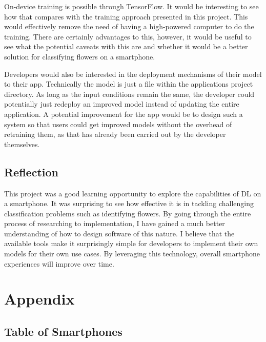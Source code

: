 \documentclass[12pt,a4paper]{report}
\begin{document}
\par

On-device training is possible through TensorFlow. It would be interesting to see how that compares with the training 
approach presented in this project. This would effectively remove the need of having a high-powered computer to do the 
training. There are certainly advantages to this, however, it would be useful to see what the potential caveats with 
this are and whether it would be a better solution for classifying flowers on a smartphone.

\par

Developers would also be interested in the deployment mechanisms of their model to their app. Technically the model is just 
a file within the applications project directory. As long as the input conditions remain the same, the developer could 
potentially just redeploy an improved model instead of updating the entire application. A potential improvement for the 
app would be to design such a system so that users could get improved models without the overhead of retraining them, as
that has already been carried out by the developer themselves.

\section{Reflection}

This project was a good learning opportunity to explore the capabilities of DL on a smartphone. It was 
surprising to see how effective it is in tackling challenging classification problems such as identifying flowers. 
By going through 
the entire process of researching to implementation, I have gained a much better understanding of how to design software 
of this nature. I believe that the available tools make it surprisingly simple for developers to implement their own 
models for their own use cases. By leveraging this technology, overall smartphone experiences will improve over time.

\clearpage


\clearpage

\appendix

\chapter{Appendix}

\section{Table of Smartphones}
\end{document}
